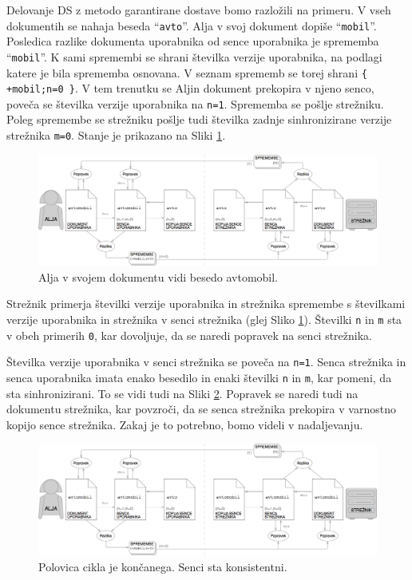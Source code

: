 \documentclass[a4paper, 12pt, twoside]{book}
\begin{document}
Delovanje DS z metodo garantirane dostave bomo razložili na primeru. V vseh dokumentih se nahaja beseda “{\tt avto}”. Alja v svoj dokument dopiše “{\tt mobil}”. Posledica razlike dokumenta uporabnika od sence uporabnika je sprememba “{\tt mobil}”. K sami spremembi se shrani številka verzije uporabnika, na podlagi katere je bila sprememba osnovana. V seznam sprememb se torej shrani {\tt \{ +mobil;n=0 \}}. V tem trenutku se Aljin dokument prekopira v njeno senco, poveča se številka verzije uporabnika na {\tt n=1}. Sprememba se pošlje strežniku. Poleg spremembe se strežniku pošlje tudi številka zadnje sinhronizirane verzije strežnika {\tt m=0}. Stanje je prikazano na Sliki \ref{ds4}.

\begin{figure}[placement h]
\begin{center}
\includegraphics[width=16cm]{ds4.png}
\end{center}
\caption{Alja v svojem dokumentu vidi besedo avtomobil.}
\label{ds4}
\end{figure}

Strežnik primerja številki verzije uporabnika in strežnika spremembe s številkami verzije uporabnika in strežnika v senci strežnika (glej Sliko \ref{ds4}). Številki {\tt n} in {\tt m} sta v obeh primerih {\tt 0}, kar dovoljuje, da se naredi popravek na senci strežnika.

\pagebreak

Številka verzije uporabnika v senci strežnika se poveča na {\tt n=1}. Senca strežnika in senca uporabnika imata enako besedilo in enaki številki {\tt n} in {\tt m}, kar pomeni, da sta sinhronizirani. To se vidi tudi na Sliki \ref{ds5}. Popravek se naredi tudi na dokumentu strežnika, kar povzroči, da se senca strežnika prekopira v varnostno kopijo sence strežnika. Zakaj je to potrebno, bomo videli v nadaljevanju.

\begin{figure}[placement h]
\begin{center}
\includegraphics[width=16cm]{ds5.png}
\end{center}
\caption{Polovica cikla je končanega. Senci sta konsistentni.}
\label{ds5}
\end{figure}
\end{document}

